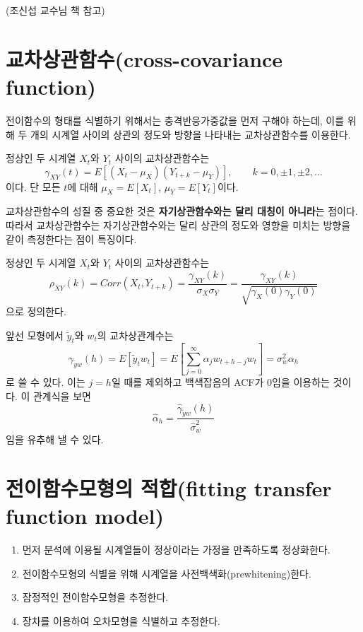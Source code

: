 \documentclass[b5paper,]{scrbook}
\theoremstyle{plain}
\theoremstyle{definition}
\numberwithin{equation}{section}
\let\BeginKnitrBlock\begin \let\EndKnitrBlock\end
\begin{document}
(조신섭 교수님 책 참고)

\hypertarget{cross-covariance-function}{%
\section{교차상관함수(cross-covariance function)}\label{cross-covariance-function}}

전이함수의 형태를 식별하기 위해서는 충격반응가중값을 먼저 구해야 하는데, 이를 위해 두 개의 시계열 사이의 상관의 정도와 방향을 나타내는 교차상관함수를 이용한다.

\BeginKnitrBlock{definition}[교차상관함수]
\protect\hypertarget{def:unnamed-chunk-227}{}{\label{def:unnamed-chunk-227} {} }정상인 두 시계열 \(X_{t}\)와 \(Y_{t}\) 사이의 교차상관함수는
\[\gamma_{XY}(t)=E[(X_{t}-\mu_{X})(Y_{t+k}-\mu_{Y})], \qquad{k=0,\pm 1, \pm 2, \ldots}\]
이다. 단 모든 \(t\)에 대해 \(\mu_{X}=E[X_{t}]\), \(\mu_{Y}=E[Y_{t}]\)이다.
\EndKnitrBlock{definition}

교차상관함수의 성질 중 중요한 것은 \textbf{자기상관함수와는 달리 대칭이 아니라}는 점이다. 따라서 교차상관함수는 자기상관함수와는 달리 상관의 정도와 영향을 미치는 방향을 같이 측정한다는 점이 특징이다.

\BeginKnitrBlock{definition}[교차상관계수]
\protect\hypertarget{def:unnamed-chunk-228}{}{\label{def:unnamed-chunk-228} {} }정상인 두 시계열 \(X_{t}\)와 \(Y_{t}\) 사이의 교차상관함수는
\[\rho_{XY}(k)=Corr(X_{t},Y_{t+k})=\frac{\gamma_{XY}(k)}{\sigma_{X}\sigma_{Y}}=\frac{\gamma_{XY}(k)}{\sqrt{\gamma_{X}(0)\gamma_{Y}(0)}}\]
으로 정의한다.
\EndKnitrBlock{definition}

앞선 모형에서 \(\tilde{y}_{t}\)와 \(w_{t}\)의 교차상관계수는
\[\gamma_{\tilde{y} w}(h)=E[\tilde{y}_{t} w_{t}]=E[\sum_{j=0}^{\infty}\alpha_{j}w_{t+h-j}w_{t}]=\sigma_{w}^{2}\alpha_{h}\]
로 쓸 수 있다. 이는 \(j=h\)일 때를 제외하고 백색잡음의 ACF가 0임을 이용하는 것이다. 이 관계식을 보면
\[\hat{\alpha}_{h}=\frac{\hat{\gamma}_{\tilde{y}w}(h)}{\hat{\sigma}_{w}^{2}}\]
임을 유추해 낼 수 있다.

\hypertarget{-fitting-transfer-function-model}{%
\section{전이함수모형의 적합(fitting transfer function model)}\label{-fitting-transfer-function-model}}

\begin{enumerate}
\def\labelenumi{\arabic{enumi}.}
\item
  먼저 분석에 이용될 시계열들이 정상이라는 가정을 만족하도록 정상화한다.
\item
  전이함수모형의 식별을 위해 시계열을 사전백색화(prewhitening)한다.
\item
  잠정적인 전이함수모형을 추정한다.
\item
  장차를 이용하여 오차모형을 식별하고 추정한다.
\end{enumerate}
\end{document}
